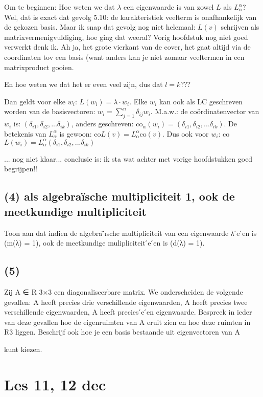 \documentclass{article}
\begin{document}
Om te beginnen: 
Hoe weten we dat $\lambda$ een eigenwaarde is van zowel $L$ als $L_{\alpha}^{\alpha}$? Wel, dat is exact dat gevolg 5.10: de karakteristiek veelterm is onafhankelijk van de gekozen basis. Maar ik snap dat gevolg nog niet helemaal: $L(v)$ schrijven als matrixvermenigvuldiging, hoe ging dat weeral? 
Vorig hoofdstuk nog niet goed verwerkt denk ik. Ah ja, het grote vierkant van de cover, het gaat altijd via de coordinaten tov een basis (want anders kan je niet zomaar veeltermen in een matrixproduct gooien. 

En hoe weten we dat het er even veel zijn, dus dat $l=k$???

Dan geldt voor elke $w_i$: $L(w_i)=\lambda \cdot w_i$. 
Elke $w_i$ kan ook als LC geschreven worden van de basisvectoren: 
$w_i = \sum_{j=1}^{n} \delta_{ij} w_i$. M.a.w.: de co\"ordinatenvector van $w_i$ is: $(\delta_{i1}, \delta_{i2}, ... \delta_{ik})$, anders geschreven: co$_{\alpha}(w_i)=(\delta_{i1}, \delta_{i2}, ... \delta_{ik})$. 
De betekenis van $L_{\alpha}^{\alpha}$ is gewoon: co$L(v) 
 = L_{\alpha}^{\alpha}$co$(v)$. 
Dus ook voor $w_i$:   co$L(w_i)= L_{\alpha}^{\alpha} (\delta_{i1}, \delta_{i2}, ... \delta_{ik})$

... nog niet klaar... conclusie is: ik sta wat achter met vorige hoofdstukken goed begrijpen!! 

\subsection*{(4) als algebra\"ische multipliciteit 1, ook de meetkundige multipliciteit}

Toon aan dat indien de algebra ̈ısche multipliciteit van een eigenwaarde λ  ́e ́en is (m(λ) = 1),
ook de meetkundige mulipliciteit  ́e ́en is (d(λ) = 1).

\subsection*{(5) }
Zij A ∈ R 3×3
een diagonaliseerbare matrix. We onderscheiden de volgende gevallen:
 A heeft precies drie verschillende eigenwaarden,
 A heeft precies twee verschillende eigenwaarden,
 A heeft precies  ́e ́en eigenwaarde.
Bespreek in ieder van deze gevallen hoe de eigenruimten van A eruit zien en hoe deze
ruimten in R3 liggen. 
Beschrijf ook hoe je een basis bestaande uit eigenvectoren van A

kunt kiezen.

\section*{Les 11, 12 dec}
\end{document}
